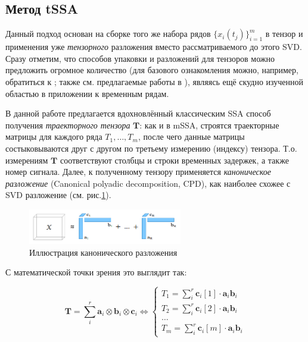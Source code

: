 			\subsection*{Метод tSSA}
			
			Данный подход основан на сборке того же набора рядов $ \{x_i(t_j)\}_{i = 1}^{m} $ в тензор и применения уже \textit{тензорного} разложения вместо рассматриваемого до этого SVD. Сразу отметим, что способов упаковки и разложений для тензоров можно предложить огромное количество (для базового ознакомления можно, например, обратиться к \cite{rabanser2017introduction}; также см. предлагаемые работы в ), являясь ещё скудно изученной областью в приложении к временным рядам.
			
			 В данной работе предлагается вдохновлённый классическим SSA способ получения \textit{траекторного тензора} $ \mathbf{T} $: как и в mSSA, строятся траекторные матрицы для каждого ряда $ T_1, \ldots, T_m $, после чего данные матрицы состыковываются друг с другом по третьему измерению (индексу) тензора. Т.о. измерениям $ \mathbf{T} $ соответствуют столбцы и строки временных задержек, а также номер сигнала. Далее, к полученному тензору применяется \textit{каноническое разложение} (Canonical polyadic decomposition, CPD), как наиболее схожее с SVD разложение (см. рис.\ref{pic:cpu_dec}).
			 
			 \begin{figure}[h]
			 	\centering
			 	\includegraphics[width=0.6\textwidth, keepaspectratio]{../figs/cpu_decomp}
			 	\caption{Иллюстрация канонического разложения}\label{pic:cpu_dec}
			 \end{figure}
			 
			 С математической точки зрения это выглядит так:
			 
			 \begin{equation*}
			 	\mathbf{T} = \sum\limits_i^{r} \mathbf{a}_i \otimes \mathbf{b}_i \otimes \mathbf{c}_i \Leftrightarrow \begin{cases}
			 		T_1 = \sum\limits_i^{r} \mathbf{c}_i[1] \cdot \mathbf{a}_i  \mathbf{b}_i  \\
			 		T_2 = \sum\limits_i^{r} \mathbf{c}_i[2] \cdot \mathbf{a}_i  \mathbf{b}_i \\
			 		\ldots \\
			 		T_m = \sum\limits_i^{r} \mathbf{c}_i[m] \cdot \mathbf{a}_i  \mathbf{b}_i 
			 	\end{cases}
			 \end{equation*}
			 
